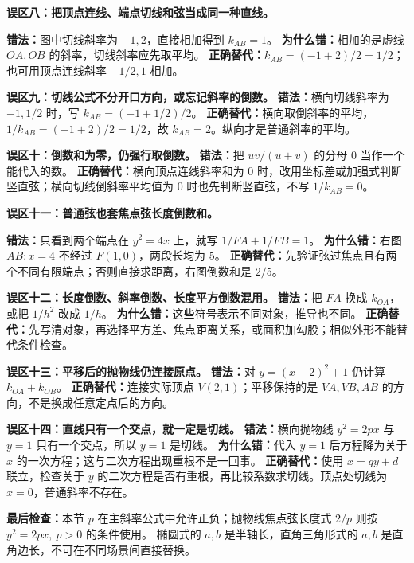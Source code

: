 \clearpage
\begin{trapbox}
\textbf{误区八：把顶点连线、端点切线和弦当成同一种直线。}
\begin{center}\end{center}
\textbf{错法：}图中切线斜率为 $-1,2$，直接相加得到 $k_{AB}=1$。
\textbf{为什么错：}相加的是虚线 $OA,OB$ 的斜率，切线斜率应先取平均。
\textbf{正确替代：}$k_{AB}=(-1+2)/2=1/2$；也可用顶点连线斜率 $-1/2,1$ 相加。

\medskip
\textbf{误区九：切线公式不分开口方向，或忘记斜率的倒数。}
\textbf{错法：}横向切线斜率为 $-1,1/2$ 时，写 $k_{AB}=(-1+1/2)/2$。
\textbf{正确替代：}横向取倒斜率的平均，$1/k_{AB}=(-1+2)/2=1/2$，故 $k_{AB}=2$。纵向才是普通斜率的平均。

\medskip
\textbf{误区十：倒数和为零，仍强行取倒数。}
\textbf{错法：}把 $uv/(u+v)$ 的分母 $0$ 当作一个能代入的数。
\textbf{正确替代：}横向顶点连线斜率和为 $0$ 时，改用坐标差或加强式判断竖直弦；横向切线倒斜率平均值为 $0$ 时也先判断竖直弦，不写 $1/k_{AB}=0$。
\end{trapbox}

\clearpage
\begin{trapbox}
\textbf{误区十一：普通弦也套焦点弦长度倒数和。}
\begin{center}\end{center}
\textbf{错法：}只看到两个端点在 $y^2=4x$ 上，就写 $1/FA+1/FB=1$。
\textbf{为什么错：}右图 $AB:x=4$ 不经过 $F(1,0)$，两段长均为 $5$。
\textbf{正确替代：}先验证弦过焦点且有两个不同有限端点；否则直接求距离，右图倒数和是 $2/5$。

\medskip
\textbf{误区十二：长度倒数、斜率倒数、长度平方倒数混用。}
\textbf{错法：}把 $FA$ 换成 $k_{OA}$，或把 $1/h^2$ 改成 $1/h$。
\textbf{为什么错：}这些符号表示不同对象，推导也不同。
\textbf{正确替代：}先写清对象，再选择平方差、焦点距离关系，或面积加勾股；相似外形不能替代条件检查。

\medskip
\textbf{误区十三：平移后的抛物线仍连接原点。}
\textbf{错法：}对 $y=(x-2)^2+1$ 仍计算 $k_{OA}+k_{OB}$。
\textbf{正确替代：}连接实际顶点 $V(2,1)$；平移保持的是 $VA,VB,AB$ 的方向，不是换成任意定点后的方向。
\end{trapbox}

\clearpage
\begin{trapbox}
\textbf{误区十四：直线只有一个交点，就一定是切线。}
\textbf{错法：}横向抛物线 $y^2=2px$ 与 $y=1$ 只有一个交点，所以 $y=1$ 是切线。
\textbf{为什么错：}代入 $y=1$ 后方程降为关于 $x$ 的一次方程；这与二次方程出现重根不是一回事。
\textbf{正确替代：}使用 $x=qy+d$ 联立，检查关于 $y$ 的二次方程是否有重根，再比较系数求切线。顶点处切线为 $x=0$，普通斜率不存在。

\medskip
\textbf{最后检查：}本节 $p$ 在主斜率公式中允许正负；抛物线焦点弦长度式 $2/p$ 则按 $y^2=2px,\ p>0$ 的条件使用。
椭圆式的 $a,b$ 是半轴长，直角三角形式的 $a,b$ 是直角边长，不可在不同场景间直接替换。
\end{trapbox}
